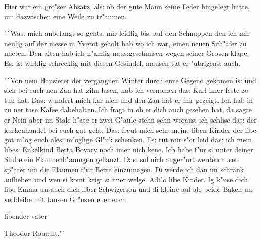 \documentclass[oneside,12pt]{book}
\newcommand{\s}{s:}%
\begin{document}
Hier war ein gro"ser Absatz, al{\s} ob der gute Mann seine Feder
hingelegt hatte, um dazwischen eine Weile zu tr"aumen.

"`Wa{\s} mich anbelangt so geht{\s} mir leidlig bi{\s} auf den
Schnuppen den ich mir neulig auf der messe in Yvetot geholt hab wo
ich war, einen neuen Sch"afer zu mieten. Den alten hab ich n"amlig
nau{\s}geschmisen wegen seiner Grosen klape. E{\s} i{\s} wirklig
schrecklig mit diesen Gesindel, mausen tat er "ubrigen{\s} auch.

"`Von nem Hausierer der vergangnen Winter durch eure Gegend
gekomen i{\s} und sich bei euch nen Zan hat zihn lasen, hab ich
vernomen da{\s} Karl imer feste ze tun hat. Da{\s} wundert mich
kar nich und den Zan hat er mir gezeigt. Ich hab in zu ner tase
Kafee dabehalten. Ich fragt in ob er dich auch gesehen hat, da
sagte er Nein aber im Stale h"ate er zwei G"aule stehn sehn
worau{\s} ich schlise da{\s} der kurkenhandel bei euch gut geht.
Da{\s} freut mich sehr meine liben Kinder der libe got m"og euch
ale{\s} m"oglige Gl"uk schenken. E{\s} tut mir s"or leid da{\s}
ich mein libe{\s} Enkelkind Berta Bovary noch imer nich kene. Ich
habe f"ur si unter deiner Stube ein Flaumenb"aumgen geflanzt.
Da{\s} sol nich anger"urt werden auser sp"ater um die Flaumen f"ur
Berta einzumagen. Di werde ich dan im schrank aufheben und wen si
komt krigt si imer welge. Adi"o libe Kinder. Ig k"use dich libe
Emma un auch dich liber Schwigerson und di kleine auf ale beide
Baken un verbleibe mit tausen Gr"usen euer euch \nopagebreak

\hfill libender vater \hspace{7em}\nopagebreak

\hfill Theodor Rouault."' \hspace{5em}
\end{document}
